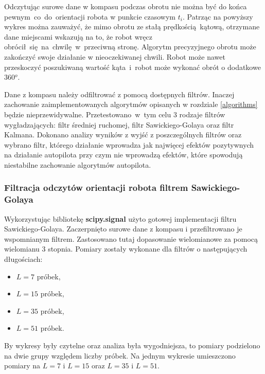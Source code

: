 {{{            
            
            Odczytując surowe dane w kompasu podczas obrotu nie można być do końca pewnym~co~do~orientacji robota w punkcie czasowym $t_i$. Patrząc na powyższy wykres można zauważyć, że mimo obrotu ze stałą prędkością kątową, otrzymane dane miejscami wskazują na to, że robot wręcz obrócił~się~na~chwilę~w~przeciwną stronę. Algorytm precyzyjnego obrotu może zakończyć swoje działanie w nieoczekiwanej chwili. Robot może nawet przeskoczyć poszukiwaną wartość kąta~i~robot może wykonać obrót o dodatkowe 360$^o$.
            
            Dane z kompasu należy odfiltrować z pomocą dostępnych filtrów. Inaczej zachowanie zaimplementowanych algorytmów opisanych w rozdziale \ref{algorithms} będzie nieprzewidywalne.
            Przetestowano~w~tym celu 3 rodzaje filtrów wygładzających: filtr średniej ruchomej, filtr Sawickiego-Golaya oraz filtr Kalmana. Dokonano analizy wyników z wyjść z poszczególnych filtrów oraz wybrano filtr, którego działanie wprowadza jak najwięcej efektów pozytywnych na działanie autopilota przy czym nie wprowadzą efektów, które spowodują niestabilne zachowanie algorytmów autopilota.
        }
        \newpage
        \subsubsection{Filtracja odczytów orientacji robota filtrem Sawickiego-Golaya}
        {
        Wykorzystując bibliotekę \textbf{scipy.signal} użyto gotowej implementacji filtru Sawickiego-Golaya. Zaczerpnięto surowe dane z kompasu i przefiltrowano je wspomnianym filtrem. Zastosowano tutaj dopasowanie wielomianowe za pomocą wielomianu 3 stopnia.
        Pomiary zostały wykonane dla filtrów o następujących długościach:
        
        \begin{center}
            \begin{itemize}
                \item $L=7$ próbek,
                \item $L=15$ próbek,
                \item $L=35$ próbek,
                \item $L=51$ próbek.
            \end{itemize}
        \end{center}

        By wykresy były czytelne oraz analiza była wygodniejsza, to pomiary podzielono na dwie grupy względem liczby próbek. Na jednym wykresie umieszczono pomiary na $L=7$ i $L=15$ oraz $L=35$ i $L=51$.
        
}}}
